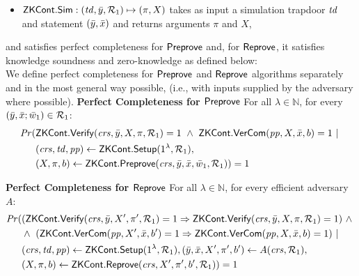 \begin{definition}[ZK Continuations]
\begin{itemize}
\item ${\mathsf{ZKCont}}.{\mathsf{Sim}}: (\mathit{td}, \bar{y}, \mathcal{R}_1) \mapsto (\pi, X)$ takes as input a simulation trapdoor $\mathit{td}$ and statement $(\bar{y}, \bar{x})$ and returns 
arguments $\pi$ and $X$,
\end{itemize}
and satisfies perfect completeness for ${\mathsf{Preprove}}$ and, for ${\mathsf{Reprove}}$, it satisfies knowledge soundness and zero-knowledge as defined below:\\
\noindent We define perfect completeness for ${\mathsf{Preprove}}$ and ${\mathsf{Reprove}}$ algorithms separately and in the most general way possible,
(i.e., with inputs supplied by the adversary where possible).  
\noindent \textbf{Perfect Completeness for ${\mathsf{Preprove}}$} For all $\lambda \in \mathbb{N}$, for every $(\bar{y}, \bar{x}; \bar{w}_1) \in \mathcal{R}_1$:
\begin{align*}
\mathit{Pr} (& \ZKCont.\Verify(\crs, \bar{y}, X, \pi, \relone) = 1 \ \wedge \ \ZKCont.\VerifyCom (\pp, X, \barx, b) = 1\  | \ \\ 
                   & (\crs, \tw, \pp) \leftarrow \ZKCont.\Setup (1^{\lambda}, \relone), \\ 
                   & (X, \pi, b) \leftarrow \ZKCont.\Preprove(\crs, \bar{y}, \bar{x}, \baromega_1, \relone)) = 1
\end{align*}

\noindent \textbf{Perfect Completeness for ${\mathsf{Reprove}}$} For all $\lambda \in \mathbb{N}$, for every efficient adversary $A$: 
\begin{align*}
\mathit{Pr} (& (\ZKCont.\Verify(\crs, \bar{y}, X', \pi', \relone) = 1  \Rightarrow \ZKCont.\Verify(\crs, \bar{y}, X, \pi, \relone) = 1)  \ \wedge \  \\
                   & \wedge \ (\ZKCont.\VerifyCom (\pp, X', \barx, b') = 1 \Rightarrow \ZKCont.\VerifyCom (\pp, X, \barx, b) = 1) \ | \\
                   & (\crs, \tw, \pp) \leftarrow \ZKCont.\Setup (1^{\lambda}, \relone),  (\bary, \barx, X', \pi', b') \leftarrow A(\crs,\relone), \\
                   & (X, \pi, b) \leftarrow \ZKCont.\Reprove(\crs, X', \pi', b', \relone)) = 1
\end{align*}


\end{definition}
